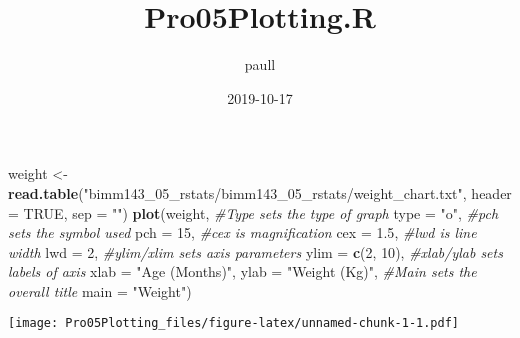 \documentclass[]{article}
\title{Pro05Plotting.R}
\author{paull}
\date{2019-10-17}
\newenvironment{Shaded}{\begin{snugshade}}{\end{snugshade}}
\newcommand{\CharTok}[1]{\textcolor[rgb]{0.31,0.60,0.02}{#1}}
\newcommand{\CommentTok}[1]{\textcolor[rgb]{0.56,0.35,0.01}{\textit{#1}}}
\newcommand{\DataTypeTok}[1]{\textcolor[rgb]{0.13,0.29,0.53}{#1}}
\newcommand{\DecValTok}[1]{\textcolor[rgb]{0.00,0.00,0.81}{#1}}
\newcommand{\FloatTok}[1]{\textcolor[rgb]{0.00,0.00,0.81}{#1}}
\newcommand{\KeywordTok}[1]{\textcolor[rgb]{0.13,0.29,0.53}{\textbf{#1}}}
\newcommand{\NormalTok}[1]{#1}
\newcommand{\OperatorTok}[1]{\textcolor[rgb]{0.81,0.36,0.00}{\textbf{#1}}}
\newcommand{\OtherTok}[1]{\textcolor[rgb]{0.56,0.35,0.01}{#1}}
\newcommand{\StringTok}[1]{\textcolor[rgb]{0.31,0.60,0.02}{#1}}
\begin{document}
\maketitle

\begin{Shaded}
\begin{Highlighting}[]
\NormalTok{weight <-}\StringTok{ }\KeywordTok{read.table}\NormalTok{(}\StringTok{"bimm143_05_rstats/bimm143_05_rstats/weight_chart.txt"}\NormalTok{,}
                     \DataTypeTok{header =} \OtherTok{TRUE}\NormalTok{,}
                     \DataTypeTok{sep =} \StringTok{""}\NormalTok{)}
\KeywordTok{plot}\NormalTok{(weight,}
     \CommentTok{#Type sets the type of graph}
     \DataTypeTok{type =} \StringTok{"o"}\NormalTok{,}
     \CommentTok{#pch sets the symbol used}
     \DataTypeTok{pch =} \DecValTok{15}\NormalTok{, }
     \CommentTok{#cex is magnification}
     \DataTypeTok{cex =} \FloatTok{1.5}\NormalTok{,}
     \CommentTok{#lwd is line width}
     \DataTypeTok{lwd =} \DecValTok{2}\NormalTok{, }
     \CommentTok{#ylim/xlim sets axis parameters}
     \DataTypeTok{ylim =} \KeywordTok{c}\NormalTok{(}\DecValTok{2}\NormalTok{, }\DecValTok{10}\NormalTok{), }
     \CommentTok{#xlab/ylab sets labels of axis}
     \DataTypeTok{xlab =} \StringTok{"Age (Months)"}\NormalTok{,}
     \DataTypeTok{ylab =} \StringTok{"Weight (Kg)"}\NormalTok{,}
     \CommentTok{#Main sets the overall title}
     \DataTypeTok{main =} \StringTok{"Weight"}\NormalTok{)}
\end{Highlighting}
\end{Shaded}

\texttt{[image: Pro05Plotting\_files/figure-latex/unnamed-chunk-1-1.pdf]}

\begin{Shaded}
\end{Shaded}
\end{document}
